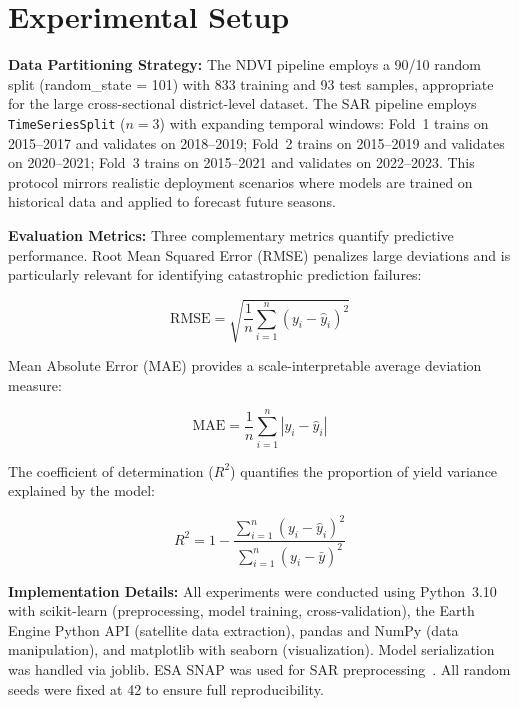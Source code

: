 \documentclass[conference]{IEEEtran}
\begin{document}
\section{Experimental Setup}

\textbf{Data Partitioning Strategy:} The NDVI pipeline employs a 90/10
random split (random\_state = 101) with 833 training and 93 test samples,
appropriate for the large cross-sectional district-level dataset. The SAR
pipeline employs \texttt{TimeSeriesSplit} ($n = 3$) with expanding temporal
windows: Fold~1 trains on 2015--2017 and validates on 2018--2019; Fold~2
trains on 2015--2019 and validates on 2020--2021; Fold~3 trains on 2015--2021
and validates on 2022--2023. This protocol mirrors realistic deployment
scenarios where models are trained on historical data and applied to forecast
future seasons.

\textbf{Evaluation Metrics:} Three complementary metrics quantify predictive
performance. Root Mean Squared Error (RMSE) penalizes large deviations and
is particularly relevant for identifying catastrophic prediction failures:

\begin{equation}
\text{RMSE} = \sqrt{\frac{1}{n}\sum_{i=1}^{n}(y_i - \hat{y}_i)^2}
\label{eq:rmse}
\end{equation}

Mean Absolute Error (MAE) provides a scale-interpretable average deviation
measure:

\begin{equation}
\text{MAE} = \frac{1}{n}\sum_{i=1}^{n}|y_i - \hat{y}_i|
\label{eq:mae}
\end{equation}

The coefficient of determination ($R^2$) quantifies the proportion of yield
variance explained by the model:

\begin{equation}
R^2 = 1 - \frac{\sum_{i=1}^{n}(y_i-\hat{y}_i)^2}{\sum_{i=1}^{n}(y_i-\bar{y})^2}
\label{eq:r2}
\end{equation}

\textbf{Implementation Details:} All experiments were conducted using
Python~3.10 with scikit-learn (preprocessing, model training,
cross-validation), the Earth Engine Python API (satellite data extraction),
pandas and NumPy (data manipulation), and matplotlib with seaborn
(visualization). Model serialization was handled via joblib. ESA SNAP was
used for SAR preprocessing~\cite{esa2022}. All random seeds were fixed at 42
to ensure full reproducibility.
\end{document}
